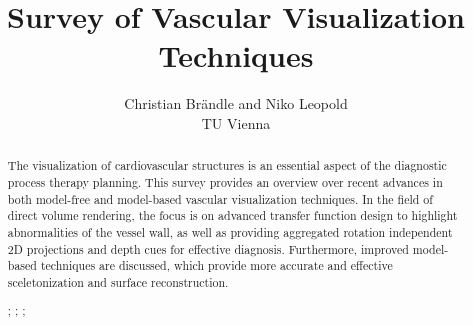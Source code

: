 \documentclass{egpubl}
\title{Survey of Vascular Visualization Techniques}
\author[C. Br{\"a}ndle \& N. Leopold]{Christian Br{\"a}ndle and Niko Leopold\\TU Vienna\\}
\begin{document}
\graphicspath{{images/}}

\maketitle


\begin{abstract}
	The visualization of cardiovascular structures is an essential aspect of 
    the diagnostic process therapy planning. This survey provides an overview
    over recent advances in both model-free and model-based vascular visualization techniques.
    In the field of direct volume rendering, the focus is on advanced transfer function design to         
	highlight abnormalities of the vessel wall, as well as providing aggregated rotation independent
	2D projections and depth cues for effective diagnosis.
	Furthermore, improved model-based techniques are discussed, which provide 
	more accurate and effective sceletonization and surface reconstruction.
		
	\begin{classification} %
		;
		;
		;
	\end{classification}
	
\end{abstract}







%




%

%


\end{document}
